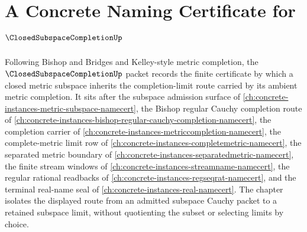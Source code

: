 \chapter{A Concrete Naming Certificate for $\ClosedSubspaceCompletionUp$}
\label{ch:concrete-instances-closed-subspace-completion-namecert}

Following Bishop and Bridges and Kelley-style metric completion, the $\ClosedSubspaceCompletionUp$ packet records the finite certificate by which a closed metric subspace inherits the completion-limit route carried by its ambient metric completion. It sits after the subspace admission surface of \autoref{ch:concrete-instances-metric-subspace-namecert}, the Bishop regular Cauchy completion route of \autoref{ch:concrete-instances-bishop-regular-cauchy-completion-namecert}, the completion carrier of \autoref{ch:concrete-instances-metriccompletion-namecert}, the complete-metric limit row of \autoref{ch:concrete-instances-completemetric-namecert}, the separated metric boundary of \autoref{ch:concrete-instances-separatedmetric-namecert}, the finite stream windows of \autoref{ch:concrete-instances-streamname-namecert}, the regular rational readbacks of \autoref{ch:concrete-instances-regseqrat-namecert}, and the terminal real-name seal of \autoref{ch:concrete-instances-real-namecert}. The chapter isolates the displayed route from an admitted subspace Cauchy packet to a retained subspace limit, without quotienting the subset or selecting limits by choice.

